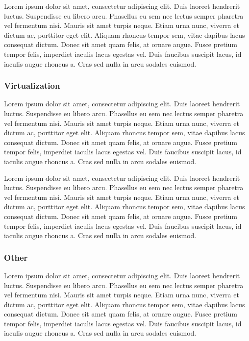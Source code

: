 \documentclass[final,conference,11pt]{IEEEtran}
\begin{document}
Lorem ipsum dolor sit amet, consectetur adipiscing elit. Duis laoreet hendrerit luctus. Suspendisse eu libero arcu. Phasellus eu sem nec lectus semper pharetra vel fermentum nisi. Mauris sit amet turpis neque. Etiam urna nunc, viverra et dictum ac, porttitor eget elit. Aliquam rhoncus tempor sem, vitae dapibus lacus consequat dictum. Donec sit amet quam felis, at ornare augue. Fusce pretium tempor felis, imperdiet iaculis lacus egestas vel. Duis faucibus suscipit lacus, id iaculis augue rhoncus a. Cras sed nulla in arcu sodales euismod.

\subsubsection{Virtualization}
Lorem ipsum dolor sit amet, consectetur adipiscing elit. Duis laoreet hendrerit luctus. Suspendisse eu libero arcu. Phasellus eu sem nec lectus semper pharetra vel fermentum nisi. Mauris sit amet turpis neque. Etiam urna nunc, viverra et dictum ac, porttitor eget elit. Aliquam rhoncus tempor sem, vitae dapibus lacus consequat dictum. Donec sit amet quam felis, at ornare augue. Fusce pretium tempor felis, imperdiet iaculis lacus egestas vel. Duis faucibus suscipit lacus, id iaculis augue rhoncus a. Cras sed nulla in arcu sodales euismod.

Lorem ipsum dolor sit amet, consectetur adipiscing elit. Duis laoreet hendrerit luctus. Suspendisse eu libero arcu. Phasellus eu sem nec lectus semper pharetra vel fermentum nisi. Mauris sit amet turpis neque. Etiam urna nunc, viverra et dictum ac, porttitor eget elit. Aliquam rhoncus tempor sem, vitae dapibus lacus consequat dictum. Donec sit amet quam felis, at ornare augue. Fusce pretium tempor felis, imperdiet iaculis lacus egestas vel. Duis faucibus suscipit lacus, id iaculis augue rhoncus a. Cras sed nulla in arcu sodales euismod.

\subsubsection{Other}
Lorem ipsum dolor sit amet, consectetur adipiscing elit. Duis laoreet hendrerit luctus. Suspendisse eu libero arcu. Phasellus eu sem nec lectus semper pharetra vel fermentum nisi. Mauris sit amet turpis neque. Etiam urna nunc, viverra et dictum ac, porttitor eget elit. Aliquam rhoncus tempor sem, vitae dapibus lacus consequat dictum. Donec sit amet quam felis, at ornare augue. Fusce pretium tempor felis, imperdiet iaculis lacus egestas vel. Duis faucibus suscipit lacus, id iaculis augue rhoncus a. Cras sed nulla in arcu sodales euismod.
\end{document}
